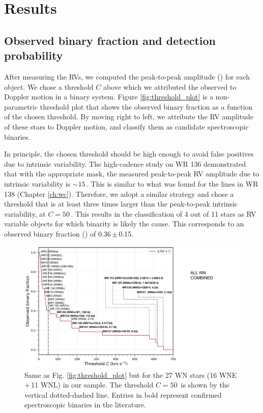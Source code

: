 
\section{Results} \label{sect:results_WNL}
\subsection{Observed binary fraction and detection probability}
After measuring the RVs, we computed the peak-to-peak amplitude (\DelRV{}) for each object. We chose a threshold $C$ above which we attributed the observed \DelRV{} to Doppler motion in a binary system. Figure \ref{fig:threshold_plot} is a non-parametric threshold plot that shows the observed binary fraction as a function of the chosen threshold. By moving right to left, we attribute the RV amplitude of these stars to Doppler motion, and classify them as candidate spectroscopic binaries.

In principle, the chosen threshold should be high enough to avoid false positives due to intrinsic variability. The high-cadence study on WR 136 demonstrated that with the appropriate mask, the measured peak-to-peak RV amplitude due to intrinsic variability is ${\sim}15$\,\kms{}. This is similar to what was found for the \nv{} lines in WR 138 (Chapter \ref{ch:wc}). Therefore, we adopt a similar strategy and chose a threshold that is at least three times larger than the peak-to-peak intrinsic variability, at $C=50$\,\kms{}. This results in the classification of 4 out of 11 stars as RV variable objects for which binarity is likely the cause. This corresponds to an observed binary fraction (\fobsWNL{}) of 0.36\,$\pm$\,0.15.

\begin{figure}
    \centering
    \includegraphics[width=\hsize]{chapters/WNL/image/BINFRAC_WN_1905.pdf}
    \caption{Same as Fig. \ref{fig:threshold_plot} but for the 27 WN stars (16 WNE\,+\,11 WNL) in our sample. The threshold $C=50\,$\kms{} is shown by the vertical dotted-dashed line. Entries in bold represent confirmed spectroscopic binaries in the literature.}
    \label{fig:threshold_plot_WN}
\end{figure}

